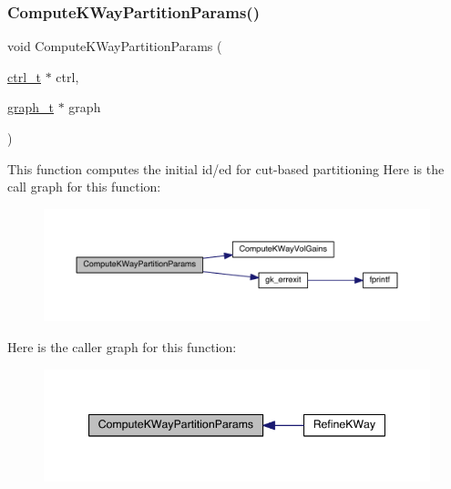 \subsubsection{\texorpdfstring{Compute\+K\+Way\+Partition\+Params()}{ComputeKWayPartitionParams()}}
{\footnotesize\ttfamily void Compute\+K\+Way\+Partition\+Params (\begin{DoxyParamCaption}\item[{\hyperlink{a00742}{ctrl\+\_\+t} $\ast$}]{ctrl,  }\item[{\hyperlink{a00734}{graph\+\_\+t} $\ast$}]{graph }\end{DoxyParamCaption})}

This function computes the initial id/ed for cut-\/based partitioning Here is the call graph for this function\+:\nopagebreak
\begin{figure}[H]
\begin{center}
\leavevmode
\includegraphics[width=350pt]{a00945_afd723ab2f44ffaa25d1d9f1909e06dfd_cgraph}
\end{center}
\end{figure}
Here is the caller graph for this function\+:\nopagebreak
\begin{figure}[H]
\begin{center}
\leavevmode
\includegraphics[width=344pt]{a00945_afd723ab2f44ffaa25d1d9f1909e06dfd_icgraph}
\end{center}
\end{figure}
\mbox{\label{a00945_acd248e19a1ba82c235d52479e231e2f7}} 
